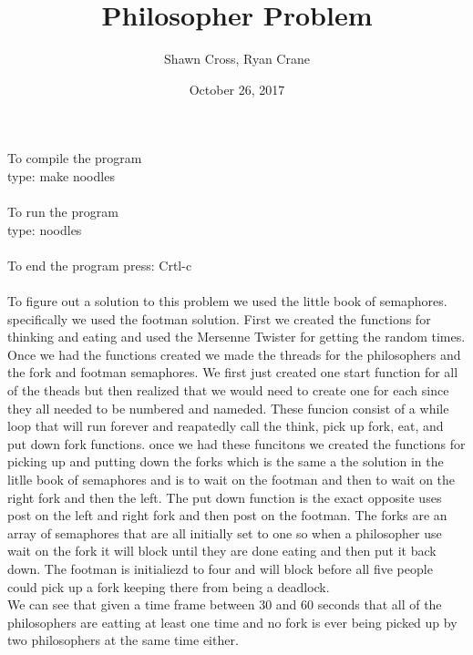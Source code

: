 \documentclass[letterpaper,10pt,titlepage]{article}
\begin{document}
\title{Philosopher Problem}
\date{October 26, 2017}
\author{Shawn Cross, Ryan Crane}
\maketitle

To compile the program\\

type: make noodles\\\\

To run the program\\

type: noodles\\\\

To end the program press: Crtl-c\\\\

To figure out a solution to this problem we used the little book of semaphores. 
specifically we used the footman solution. First we created the functions for 
thinking and eating and used the Mersenne Twister for getting the random times. 
Once we had the functions created we made the threads for the philosophers and 
the fork and footman semaphores. We first just created one start function for 
all of the theads but then realized that we would need to create one for each 
since they all needed to be numbered and nameded. These funcion consist of a 
while loop that will run forever and reapatedly call the think, pick up fork, 
eat, and put down fork functions. once we had these funcitons we created the 
functions for picking up and putting down the forks which is the same a the 
solution in the litlle book of semaphores and is to wait on the footman and 
then to wait on the right fork and then the left. The put down function is 
the exact opposite uses post on the left and right fork and then post on the 
footman. The forks are an array of semaphores that are all initially set to 
one so when a philosopher use wait on the fork it will block until they are 
done eating and then put it back down. The footman is initialiezd to four and 
will block before all five people could pick up a fork keeping there from being 
a deadlock.\\ 

We can see that given a time frame between 30 and 60 seconds that all of the 
philosophers are eatting at least one time and no fork is ever being picked 
up by two philosophers at the same time either. 
\end{document}
